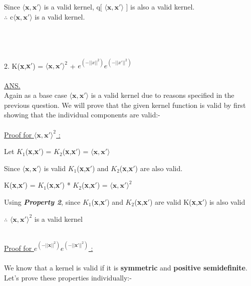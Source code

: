 \documentclass{article}
\begin{document}
Since $\langle \textbf{x},\textbf{x$'$} \rangle$ is a valid kernel, q[ $\langle \textbf{x},\textbf{x$'$} \rangle$ ] is also a valid kernel. \\
$\therefore$ \quad c$\langle \textbf{x},\textbf{x$'$} \rangle$ is a valid kernel. 

\\~\\~\\

2. K(\textbf{x},\textbf{x$'$}) = $\langle \textbf{x},\textbf{x$'$} \rangle^2$ + $e^{(-||x||^2)}$$e^{(-||x'||^2)}$
\\~\\
\underline{ANS.} \\
Again as a base case $\langle \textbf{x},\textbf{x$'$} \rangle$ is a valid kernel due to reasons specified in the previous question. We will prove that the given kernel function is valid by first showing that the individual components are valid:-
\\~\\
\underline{Proof for $\langle \textbf{x},\textbf{x$'$} \rangle^2$ :} \\
\begin{center}
Let \quad $K_1$(\textbf{x},\textbf{x$'$}) = $K_2$(\textbf{x},\textbf{x$'$}) = $\langle \textbf{x},\textbf{x$'$} \rangle$ 
\end{center}
Since $\langle \textbf{x},\textbf{x$'$} \rangle$ is valid $K_1$(\textbf{x},\textbf{x$'$}) and $K_2$(\textbf{x},\textbf{x$'$}) are also valid. 
\begin{center}
K(\textbf{x},\textbf{x$'$}) = $K_1$(\textbf{x},\textbf{x$'$}) * $K_2$(\textbf{x},\textbf{x$'$}) = $\langle \textbf{x},\textbf{x$'$} \rangle^2$
\end{center}
Using \textbf{\textit{Property 2}}, since $K_1$(\textbf{x},\textbf{x$'$}) and $K_2$(\textbf{x},\textbf{x$'$}) are valid K(\textbf{x},\textbf{x$'$}) is also valid \\
\begin{center}
$\therefore$ \quad $\langle \textbf{x},\textbf{x$'$} \rangle^2$ is a valid kernel
\end{center}
\\
\underline{Proof for $e^{(-||\textbf{x}||^2)}$$e^{(-||\textbf{x$'$}||^2)}$ :} 
\\~\\
We know that a kernel is valid if it is \textbf{symmetric} and \textbf{positive semidefinite}. Let's prove these properties individually:- \\
\begin{itemize}

\end{itemize}$$
\end{document}
